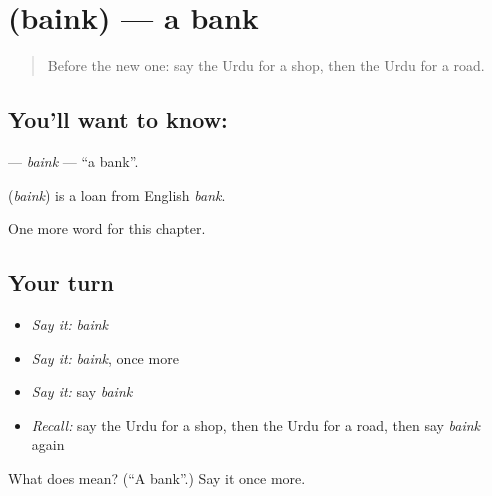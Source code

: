\section[\texorpdfstring{\ur{بینک} (baink)}{بینک (baink)}]{ (baink) — a bank}

\label{lesson:UR-C79-baink}



\begin{quote}
Before the new one: say the Urdu for a shop, then the Urdu for a road.
\end{quote}

\subsection*{You'll want to know: }
\textbf{} — \emph{baink} — \textquotedblleft{}a bank\textquotedblright{}.

\begin{cousinweb}
\textbf{} (\emph{baink}) is a loan from English \emph{bank}.
\end{cousinweb}

\begin{grammarlens}[title={What you've built}]
One more word for this chapter.
\end{grammarlens}

\subsection*{Your turn}
\begin{itemize}
\raggedright
  \item \emph{Say it:} \emph{baink}
  \item \emph{Say it:} \emph{baink}, once more
  \item \emph{Say it:} say \emph{baink}
  \item \emph{Recall:} say the Urdu for a shop, then the Urdu for a road, then say \emph{baink} again
\end{itemize}

\begin{tcolorbox}[breakable,colback=teal!4,colframe=teal!35!black,title={Before you move on}]
What does  mean? (\textquotedblleft{}A bank\textquotedblright{}.) Say it once more.
\end{tcolorbox}
